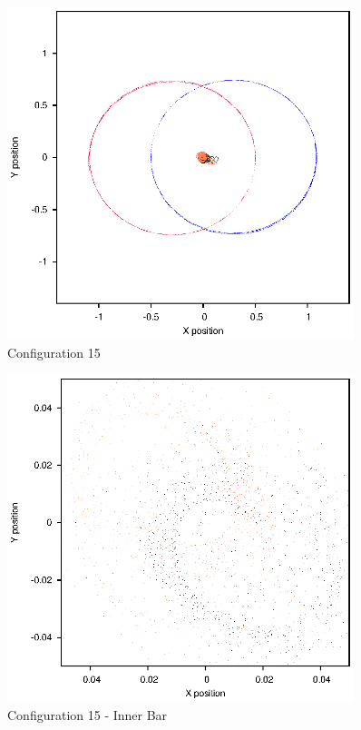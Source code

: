 \documentclass[a4paper,12pt]{article}
\begin{document}
\begin{figure}[H]
\centering
\includegraphics[width=0.9\textwidth]{./2017results/04-75-045-4/Orbit.eps}
\caption{Configuration 15}
\label{fig:config15}
\end{figure}
\begin{figure}[H]
\centering
\includegraphics[width=0.9\textwidth]{./2017results/04-75-045-4/Inner.eps}
\caption{Configuration 15 - Inner Bar}
\label{fig:config15i}
\end{figure}
\end{document}
